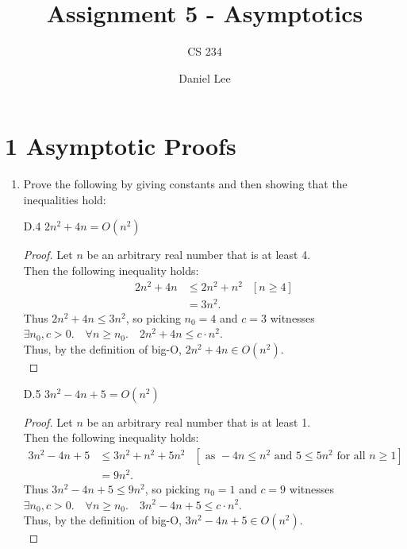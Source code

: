 \documentclass[10pt]{article}
\title{Assignment 5 - Asymptotics}
\author{CS 234}
\date{Daniel Lee}
\begin{document}
\maketitle

\section*{1 \quad Asymptotic Proofs}

\begin{enumerate}[label={}]
      \item Prove the following by giving constants and then showing that the inequalities hold:


            D.4 $2 n^2+4 n=O\left(n^2\right)$
            \begin{proof}
                  Let $n$ be an arbitrary real number that is at least 4.\\
                  Then the following inequality holds:
                  $$
                        \begin{aligned}
                              2n^2+4n & \leq 2 n^2+ n^2
                                      & {\left[n \geq 4\right] } \\
                                      & = 3 n^2 .
                        \end{aligned}
                  $$
                  Thus $2 n^2+4n \leq 3 n^2$, so picking $n_0=4$ and $c=3$ witnesses \\$\exists n_0, c>0 .\quad \forall n \geq n_0 .\quad 2 n^2+4n \leq c \cdot n^2$.\\
                        Thus, by the definition of big-O, $2 n^2+4n \in O\left(n^2\right)$.\\
            \end{proof}
            D.5 $3 n^2-4 n+5=O\left(n^2\right)$
            \begin{proof}
                  Let $n$ be an arbitrary real number that is at least 1.\\
                  Then the following inequality holds:
                  $$
                        \begin{aligned}
                              3n^2-4n+5 & \leq 3n^2+n^2+5n^2
                                        & {\left[\text { as } -4n \leq n^2 \text { and } 5 \leq 5n^2 \text { for all } n \geq 1\right] } \\
                                        & = 9 n^2 .
                        \end{aligned}
                  $$
                  Thus $3 n^2-4 n+5 \leq 9 n^2$, so picking $n_0=1$ and $c=9$ witnesses \\$\exists n_0, c>0 .\quad \forall n \geq n_0 .\quad 3 n^2-4 n+5 \leq c \cdot n^2$.\\
                        Thus, by the definition of big-O, $3 n^2-4 n+5 \in O\left(n^2\right)$.\\
            \end{proof}
            \newpage


\end{enumerate}
\end{document}
